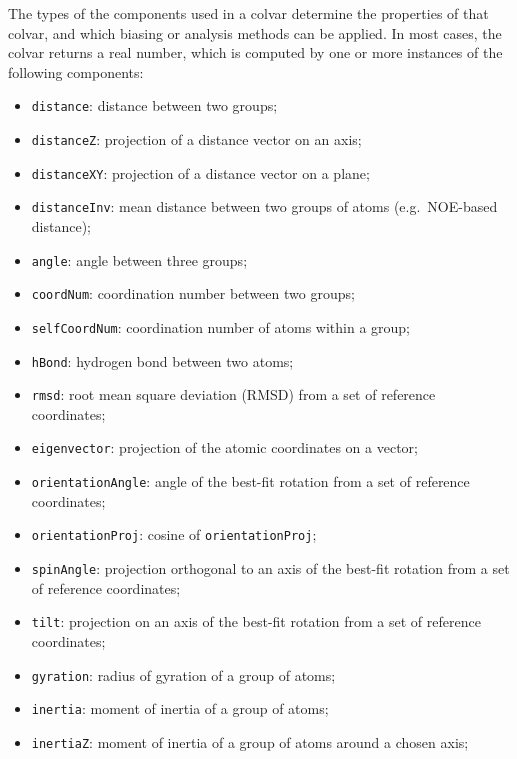 The types of the components used in a colvar determine the properties
of that colvar, and which biasing or analysis methods can be applied.
In most cases, the colvar returns a real number, which is computed by
one or more instances of the following components:
\begin{itemize}
\item \texttt{distance}: distance between two groups;
\item \texttt{distanceZ}: projection of a distance vector on an axis;
\item \texttt{distanceXY}: projection of a distance vector on a plane;
\item \texttt{distanceInv}: mean distance between two groups of atoms (e.g.~NOE-based distance);
\item \texttt{angle}: angle between three groups;
\item \texttt{coordNum}: coordination number between two groups;
\item \texttt{selfCoordNum}: coordination number of atoms within a
  group;
\item \texttt{hBond}: hydrogen bond between two atoms;
\item \texttt{rmsd}: root mean square deviation (RMSD) from a set of
  reference coordinates;
\item \texttt{eigenvector}: projection of the atomic coordinates on a
  vector;
\item \texttt{orientationAngle}: angle of the best-fit rotation from
  a set of reference coordinates;
\item \texttt{orientationProj}: cosine of \texttt{orientationProj};
\item \texttt{spinAngle}: projection orthogonal to an axis of the best-fit rotation
  from a set of reference coordinates;
\item \texttt{tilt}: projection on an axis of the best-fit rotation
  from a set of reference coordinates;
\item \texttt{gyration}: radius of gyration of a group of atoms;
\item \texttt{inertia}: moment of inertia of a group of atoms;
\item \texttt{inertiaZ}: moment of inertia of a group of atoms around a chosen axis;
\end{itemize}

